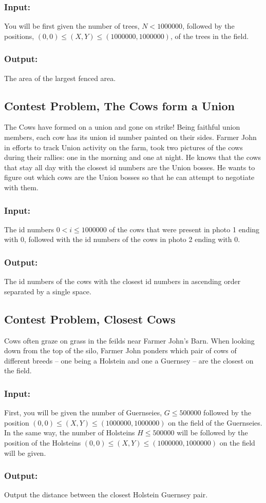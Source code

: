 \subsubsection{Input:} You will be first given the number of trees, $N<1000000$, followed by the positions, $(0,0) \leq (X,Y) \leq (1000000, 1000000)$, of the trees in the field. 
\subsubsection{Output:} The area of the largest fenced area.


\subsection{Contest Problem, The Cows form a Union}
The Cows have formed on a union and gone on strike!
Being faithful union members, each cow has its union id number painted on their sides.
Farmer John in efforts to track Union activity on the farm, took two pictures of the cows during their rallies: one in the morning and one at night.
He knows that the cows that stay all day with the closest id numbers are the Union bosses.
He wants to figure out which cows are the Union bosses so that he can attempt to negotiate with them.
\subsubsection{Input:} The id numbers $0 < i \leq 1000000$ of the cows that were present in photo 1 ending with 0, followed with the id numbers of the cows in photo 2 ending with 0.
\subsubsection{Output:} The id numbers of the cows with the closest id numbers in ascending order separated by a single space.

\subsection{Contest Problem, Closest Cows}
Cows often graze on grass in the feilds near Farmer John's Barn.
When looking down from the top of the silo, Farmer John ponders which pair of cows of different breeds -- one being a Holstein and one a Guernsey -- are the closest on the field.
\subsubsection{Input:} First, you will be given the number of Guernseies, $ G \leq 500000$ followed by the position $(0,0) \leq (X,Y) \leq (1000000,1000000)$ on the field of the Guernseies.
In the same way, the number of Holsteins $H \leq 500000$ will be followed by the position of the Holsteins $(0,0) \leq (X,Y) \leq (1000000,1000000)$ on the field will be given.
\subsubsection{Output:} Output the distance between the closest Holstein Guernsey pair.
